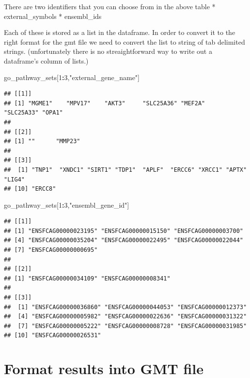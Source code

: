 \documentclass[
]{book}
\newenvironment{Shaded}{\begin{snugshade}}{\end{snugshade}}
\newcommand{\DecValTok}[1]{\textcolor[rgb]{0.00,0.00,0.81}{#1}}
\newcommand{\NormalTok}[1]{#1}
\newcommand{\SpecialCharTok}[1]{\textcolor[rgb]{0.81,0.36,0.00}{\textbf{#1}}}
\newcommand{\StringTok}[1]{\textcolor[rgb]{0.31,0.60,0.02}{#1}}
\begin{document}
There are two identifiers that you can choose from in the above table
* external\_symbols
* ensembl\_ids

Each of these is stored as a list in the dataframe. In order to convert it to the right format for the gmt file we need to convert the list to string of tab delimited strings. (unfortunately there is no streaightforward way to write out a dataframe's column of lists.)

\begin{Shaded}
\begin{Highlighting}[]
\NormalTok{go\_pathway\_sets[}\DecValTok{1}\SpecialCharTok{:}\DecValTok{3}\NormalTok{,}\StringTok{"external\_gene\_name"}\NormalTok{]}
\end{Highlighting}
\end{Shaded}

\begin{verbatim}
## [[1]]
## [1] "MGME1"    "MPV17"    "AKT3"     "SLC25A36" "MEF2A"    "SLC25A33" "OPA1"    
## 
## [[2]]
## [1] ""      "MMP23"
## 
## [[3]]
##  [1] "TNP1"  "XNDC1" "SIRT1" "TDP1"  "APLF"  "ERCC6" "XRCC1" "APTX"  "LIG4" 
## [10] "ERCC8"
\end{verbatim}

\begin{Shaded}
\begin{Highlighting}[]
\NormalTok{go\_pathway\_sets[}\DecValTok{1}\SpecialCharTok{:}\DecValTok{3}\NormalTok{,}\StringTok{"ensembl\_gene\_id"}\NormalTok{]}
\end{Highlighting}
\end{Shaded}

\begin{verbatim}
## [[1]]
## [1] "ENSFCAG00000023195" "ENSFCAG00000015150" "ENSFCAG00000003700"
## [4] "ENSFCAG00000035204" "ENSFCAG00000022495" "ENSFCAG00000022044"
## [7] "ENSFCAG00000000695"
## 
## [[2]]
## [1] "ENSFCAG00000034109" "ENSFCAG00000008341"
## 
## [[3]]
##  [1] "ENSFCAG00000036860" "ENSFCAG00000044053" "ENSFCAG00000012373"
##  [4] "ENSFCAG00000005982" "ENSFCAG00000022636" "ENSFCAG00000031322"
##  [7] "ENSFCAG00000005222" "ENSFCAG00000008728" "ENSFCAG00000031985"
## [10] "ENSFCAG00000026531"
\end{verbatim}

\hypertarget{format-results-into-gmt-file}{%
\section{Format results into GMT file}\label{format-results-into-gmt-file}}
\end{document}
